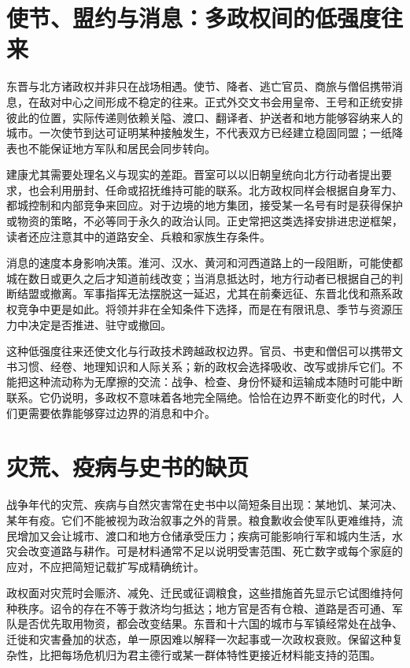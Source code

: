 \section{使节、盟约与消息：多政权间的低强度往来}
\label{sec:eastern-jin-depth-diplomacy}

东晋与北方诸政权并非只在战场相遇。使节、降者、逃亡官员、商旅与僧侣携带消息，在敌对中心之间形成不稳定的往来。正式外交文书会用皇帝、王号和正统安排彼此的位置，实际传递则依赖关隘、渡口、翻译者、护送者和地方能够容纳来人的城市。一次使节到达可证明某种接触发生，不代表双方已经建立稳固同盟；一纸降表也不能保证地方军队和居民会同步转向。

建康尤其需要处理名义与现实的差距。晋室可以以旧朝皇统向北方行动者提出要求，也会利用册封、任命或招抚维持可能的联系。北方政权同样会根据自身军力、都城控制和内部竞争来回应。对于边境的地方集团，接受某一名号有时是获得保护或物资的策略，不必等同于永久的政治认同。正史常把这类选择安排进忠逆框架，读者还应注意其中的道路安全、兵粮和家族生存条件。

消息的速度本身影响决策。淮河、汉水、黄河和河西道路上的一段阻断，可能使都城在数日或更久之后才知道前线改变；当消息抵达时，地方行动者已根据自己的判断结盟或撤离。军事指挥无法摆脱这一延迟，尤其在前秦远征、东晋北伐和燕系政权竞争中更是如此。将领并非在全知条件下选择，而是在有限讯息、季节与资源压力中决定是否推进、驻守或撤回。

这种低强度往来还使文化与行政技术跨越政权边界。官员、书吏和僧侣可以携带文书习惯、经卷、地理知识和人际关系；新的政权会选择吸收、改写或排斥它们。不能把这种流动称为无摩擦的交流：战争、检查、身份怀疑和运输成本随时可能中断联系。它仍说明，多政权不意味着各地完全隔绝。恰恰在边界不断变化的时代，人们更需要依靠能够穿过边界的消息和中介。

\section{灾荒、疫病与史书的缺页}
\label{sec:eastern-jin-depth-disaster}

战争年代的灾荒、疾病与自然灾害常在史书中以简短条目出现：某地饥、某河决、某年有疫。它们不能被视为政治叙事之外的背景。粮食歉收会使军队更难维持，流民增加又会让城市、渡口和地方仓储承受压力；疾病可能影响行军和城内生活，水灾会改变道路与耕作。可是材料通常不足以说明受害范围、死亡数字或每个家庭的应对，不应把简短记载扩写成精确统计。

政权面对灾荒时会赈济、减免、迁民或征调粮食，这些措施首先显示它试图维持何种秩序。诏令的存在不等于救济均匀抵达；地方官是否有仓粮、道路是否可通、军队是否优先取用物资，都会改变结果。东晋和十六国的城市与军镇经常处在战争、迁徙和灾害叠加的状态，单一原因难以解释一次起事或一次政权衰败。保留这种复杂性，比把每场危机归为君主德行或某一群体特性更接近材料能支持的范围。

